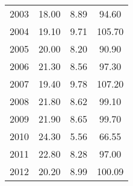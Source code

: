 \begin{table}[H]
\begin{tabular}{|rccc|}
  2003 & 18.00 & 8.89 & 94.60 \\ 
  2004 & 19.10 & 9.71 & 105.70 \\ 
  2005 & 20.00 & 8.20 & 90.90 \\ 
  2006 & 21.30 & 8.56 & 97.30 \\ 
  2007 & 19.40 & 9.78 & 107.20 \\ 
  2008 & 21.80 & 8.62 & 99.10 \\ 
  2009 & 21.90 & 8.65 & 99.70 \\ 
  2010 & 24.30 & 5.56 & 66.55 \\ 
  2011 & 22.80 & 8.28 & 97.00 \\ 
  2012 & 20.20 & 8.99 & 100.09 \\ 
   \hline
\end{tabular}
\end{table}
